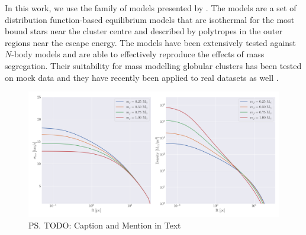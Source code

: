 In this work, we use the  family of models presented by \citet{Gieles2015}. The
 models are a set of distribution function-based equilibrium models that are isothermal
for the most bound stars near the cluster centre and described by polytropes in the outer regions
near the escape energy. The models have been extensively tested against $N$-body models
\citep{Zocchi2016, Peuten2017} and are able to effectively reproduce the effects of mass
segregation. Their suitability for mass modelling globular clusters has been tested on mock data
\citep{Henault-Brunet2019} and they have recently been applied to real datasets as well
\citep[e.g.][]{Gieles2018, Henault-Brunet2020}.

\begin{figure}
	\centering
	\includegraphics[width=1.0\textwidth]{figures/limepy_demo.png}
	\caption{\ps{TODO: Caption and Mention in Text}}
	\label{fig:1/limepy_demo}
\end{figure}


